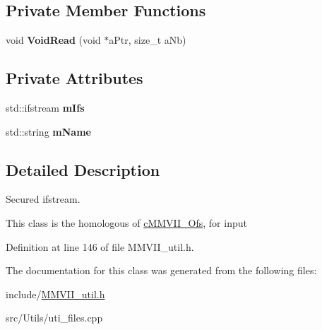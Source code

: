 \subsection*{Private Member Functions}
\begin{DoxyCompactItemize}
\item 
void {\bfseries Void\+Read} (void $\ast$a\+Ptr, size\+\_\+t a\+Nb)\hypertarget{classMMVII_1_1cMMVII__Ifs_aa12cfad2d052fe95ab89a80a85356286}{}\label{classMMVII_1_1cMMVII__Ifs_aa12cfad2d052fe95ab89a80a85356286}

\end{DoxyCompactItemize}
\subsection*{Private Attributes}
\begin{DoxyCompactItemize}
\item 
std\+::ifstream {\bfseries m\+Ifs}\hypertarget{classMMVII_1_1cMMVII__Ifs_af6934b0047cd453838999d7a629f297c}{}\label{classMMVII_1_1cMMVII__Ifs_af6934b0047cd453838999d7a629f297c}

\item 
std\+::string {\bfseries m\+Name}\hypertarget{classMMVII_1_1cMMVII__Ifs_ae426779836611da5af0e4188184d9e08}{}\label{classMMVII_1_1cMMVII__Ifs_ae426779836611da5af0e4188184d9e08}

\end{DoxyCompactItemize}


\subsection{Detailed Description}
Secured ifstream. 

This class is the homologous of \hyperlink{classMMVII_1_1cMMVII__Ofs}{c\+M\+M\+V\+I\+I\+\_\+\+Ofs}, for input 

Definition at line 146 of file M\+M\+V\+I\+I\+\_\+util.\+h.



The documentation for this class was generated from the following files\+:\begin{DoxyCompactItemize}
\item 
include/\hyperlink{MMVII__util_8h}{M\+M\+V\+I\+I\+\_\+util.\+h}\item 
src/\+Utils/uti\+\_\+files.\+cpp\end{DoxyCompactItemize}
